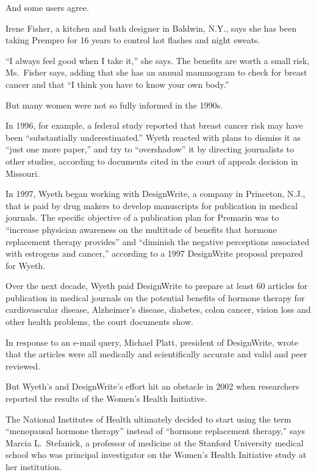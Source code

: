 ﻿\documentclass[12pt]{article}
\begin{document}
And some users agree.

Irene Fisher, a kitchen and bath designer in Baldwin, N.Y., says she has been taking Prempro for 16
years to control hot flashes and night sweats.

``I always feel good when I take it,'' she says. The benefits are worth a small risk, Ms.~Fisher
says, adding that she has an annual mammogram to check for breast cancer and that ``I think you have
to know your own body.''

But many women were not so fully informed in the 1990s.

In 1996, for example, a federal study reported that breast cancer risk may have been ``substantially
underestimated.'' Wyeth reacted with plans to dismiss it as ``just one more paper,'' and try to
``overshadow'' it by directing journalists to other studies, according to documents cited in the
court of appeals decision in Missouri.

In 1997, Wyeth began working with DesignWrite, a company in Princeton, N.J., that is paid by drug
makers to develop manuscripts for publication in medical journals. The specific objective of a
publication plan for Premarin was to ``increase physician awareness on the multitude of benefits
that hormone replacement therapy provides'' and ``diminish the negative perceptions associated with
estrogens and cancer,'' according to a 1997 DesignWrite proposal prepared for Wyeth.

Over the next decade, Wyeth paid DesignWrite to prepare at least 60 articles for publication in
medical journals on the potential benefits of hormone therapy for cardiovascular disease,
Alzheimer's disease, diabetes, colon cancer, vision loss and other health problems, the court
documents show.

In response to an e-mail query, Michael Platt, president of DesignWrite, wrote that the articles
were all medically and scientifically accurate and valid and peer reviewed.

But Wyeth's and DesignWrite's effort hit an obstacle in 2002 when researchers reported the results
of the Women's Health Initiative.

The National Institutes of Health ultimately decided to start using the term ``menopausal hormone
therapy'' instead of ``hormone replacement therapy,'' says Marcia L.~Stefanick, a professor of
medicine at the Stanford University medical school who was principal investigator on the Women's
Health Initiative study at her institution.
\end{document}
